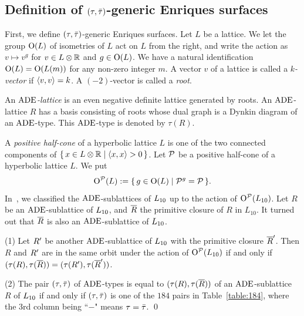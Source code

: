 \documentclass{amsart}
\numberwithin{procedure}{section}
\begin{document}
\subsection{Definition of $(\tau, \bar{\tau})$-generic Enriques surfaces}\label{subsec:tautaubar}
%
\newcommand{\sametype}{-} %
%
First, we define $(\tau, \bar{\tau})$-generic Enriques surfaces.
Let $L$ be a lattice.
We let 
the group $\mathord{\mathrm{O}}(L)$ of isometries of $L$ act on $L$ from the right,
and write the action as
$v\mapsto v^g$ for $v\in L\otimes\mathord{\mathbb R}$ and $g\in \mathord{\mathrm{O}}(L)$.
We have a natural identification $\mathord{\mathrm{O}}(L)=\mathord{\mathrm{O}}(L(m))$ for any non-zero integer $m$.
A vector $v$ of a lattice is called a \emph{$k$-vector} if  $\langle v,v \rangle=k$.
A $(-2)$-vector is called a \emph{root}.
%
\begin{definition}
An \emph{$\mathord{\rm ADE}$-lattice} is an even negative definite lattice generated by  roots.
An $\mathord{\rm ADE}$-lattice $R$ has a basis consisting of roots 
whose dual graph is a Dynkin diagram of an $\mathord{\rm ADE}$-type.
This $\mathord{\rm ADE}$-type  is denoted by $\tau(R)$.
\end{definition}
%
A \emph{positive half-cone} of a hyperbolic lattice $L$
is one of the two connected components of
$\{\,{x\in L\otimes\mathord{\mathbb R}}\mid {\langle x, x \rangle>0} \,\}$.
Let $\mathord{\mathcal P}$ be a positive half-cone of a hyperbolic lattice $L$.
We put
\[
\mathord{\mathrm{O}}^{\mathord{\mathcal P}}(L):=\{\,{g\in \mathord{\mathrm{O}}(L)}\mid {\mathord{\mathcal P}^g=\mathord{\mathcal P}} \,\}.
\]
% 
In~\cite{RDPEnriques},
we classified  the $\mathord{\rm ADE}$-sublattices of $L_{10}$ up to the action of $\mathord{\mathrm{O}}^{\mathord{\mathcal P}}(L_{10})$.
Let $R$ be an $\mathord{\rm ADE}$-sublattice of $L_{10}$,
and $\overline{R}$ the primitive closure of $R$ in $L_{10}$.
It turned out that $\overline{R}$ is also an $\mathord{\rm ADE}$-sublattice of $L_{10}$.
%
\begin{proposition}\label{prop:184}
{\rm (1)} 
Let $R\sp\prime$ be another $\mathord{\rm ADE}$-sublattice of $L_{10}$
with the primitive closure $\overline{R}\sp\prime$.
Then $R$ and $R\sp\prime$ are in the same orbit under the action 
of $\mathord{\mathrm{O}}^{\mathord{\mathcal P}}(L_{10})$ 
if and only if $(\tau(R), \tau(\overline{R}))=(\tau(R\sp\prime), \tau(\overline{R}\sp\prime))$.
\par
{\rm (2)}
The pair  $(\tau, \bar{\tau})$ of $\mathord{\rm ADE}$-types is equal to 
$(\tau(R), \tau(\overline{R}))$  of an $\mathord{\rm ADE}$-sublattice $R$ of $L_{10}$
if and only if $(\tau, \bar{\tau})$ is one of the $184$ pairs in Table~\ref{table:184},
where the 3rd column being ``$\sametype$" means $\tau=\bar{\tau}$. %
\qed
\end{proposition}
%
%
 
\end{document}
